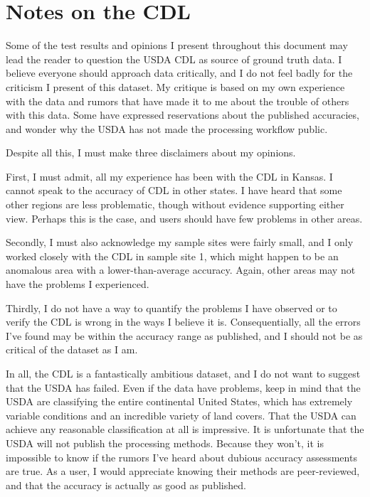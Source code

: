 \chapter{Notes on the CDL}
\label{appendix:cdl}

Some of the test results and opinions I present throughout this document may lead the reader to question the USDA CDL as source of ground truth data. I believe everyone should approach data critically, and I do not feel badly for the criticism I present of this dataset. My critique is based on my own experience with the data and rumors that have made it to me about the trouble of others with this data. Some have expressed reservations about the published accuracies, and wonder why the USDA has not made the processing workflow public.


Despite all this, I must make three disclaimers about my opinions.

First, I must admit, all my experience has been with the CDL in Kansas. I cannot speak to the accuracy of CDL in other states. I have heard that some other regions are less problematic, though without evidence supporting either view. Perhaps this is the case, and users should have few problems in other areas.

Secondly, I must also acknowledge my sample sites were fairly small, and I only worked closely with the CDL in sample site 1, which might happen to be an anomalous area with a lower-than-average accuracy. Again, other areas may not have the problems I experienced.

Thirdly, I do not have a way to quantify the problems I have observed or to verify the CDL is wrong in the ways I believe it is. Consequentially, all the errors I've found may be within the accuracy range as published, and I should not be as critical of the dataset as I am.

In all, the CDL is a fantastically ambitious dataset, and I do not want to suggest that the USDA has failed. Even if the data have problems, keep in mind that the USDA are classifying the entire continental United States, which has extremely variable conditions and an incredible variety of land covers. That the USDA can achieve any reasonable classification at all is impressive. It is unfortunate that the USDA will not publish the processing methods. Because they won't, it is impossible to know if the rumors I've heard about dubious accuracy assessments are true. As a user, I would appreciate knowing their methods are peer-reviewed, and that the accuracy is actually as good as published.
